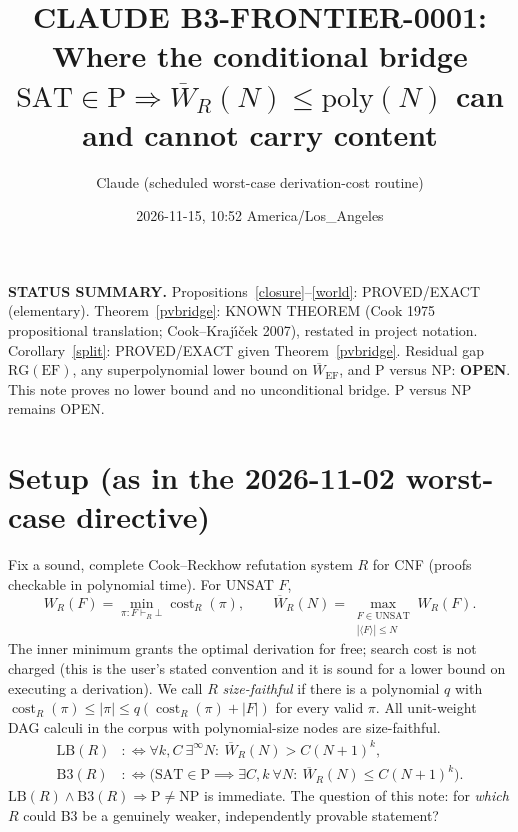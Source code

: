\documentclass[11pt]{article}
\title{CLAUDE B3-FRONTIER-0001:\\ Where the conditional bridge $\mathrm{SAT}\in\mathrm{P}\Rightarrow \overline W_R(N)\le\mathrm{poly}(N)$ can and cannot carry content}
\author{Claude (scheduled worst-case derivation-cost routine)}
\date{2026-11-15, 10:52 America/Los\_Angeles}
\theoremstyle{definition}
\theoremstyle{remark}
\begin{document}
\maketitle

\noindent\textbf{STATUS SUMMARY.}
Propositions~\ref{closure}--\ref{world}: PROVED/EXACT (elementary).
Theorem~\ref{pvbridge}: KNOWN THEOREM (Cook 1975 propositional translation; Cook--Kraj\'{\i}\v{c}ek 2007), restated in project notation.
Corollary~\ref{split}: PROVED/EXACT given Theorem~\ref{pvbridge}.
Residual gap $\mathrm{RG}(\mathrm{EF})$, any superpolynomial lower bound on $\overline W_{\mathrm{EF}}$, and P versus NP: \textbf{OPEN}.
This note proves no lower bound and no unconditional bridge. P versus NP remains OPEN.

\section{Setup (as in the 2026-11-02 worst-case directive)}
Fix a sound, complete Cook--Reckhow refutation system $R$ for CNF (proofs checkable in polynomial time). For UNSAT $F$,
\[
W_R(F)=\min_{\pi:F\vdash_R\bot}\operatorname{cost}_R(\pi),\qquad
\overline W_R(N)=\max_{\substack{F\in\mathrm{UNSAT}\\ |\langle F\rangle|\le N}} W_R(F).
\]
The inner minimum grants the optimal derivation for free; search cost is not charged (this is the user's stated convention and it is sound for a lower bound on executing a derivation).
We call $R$ \emph{size-faithful} if there is a polynomial $q$ with $\operatorname{cost}_R(\pi)\le|\pi|\le q(\operatorname{cost}_R(\pi)+|F|)$ for every valid $\pi$. All unit-weight DAG calculi in the corpus with polynomial-size nodes are size-faithful.
\begin{align*}
\mathrm{LB}(R)&:\iff \forall k,C\ \exists^\infty N:\ \overline W_R(N)>C(N+1)^k,\\
\mathrm{B3}(R)&:\iff \bigl(\mathrm{SAT}\in\mathrm{P}\implies \exists C,k\ \forall N:\ \overline W_R(N)\le C(N+1)^k\bigr).
\end{align*}
$\mathrm{LB}(R)\wedge\mathrm{B3}(R)\Rightarrow \mathrm{P}\ne\mathrm{NP}$ is immediate. The question of this note: for \emph{which} $R$ could B3 be a genuinely weaker, independently provable statement?
\end{document}
